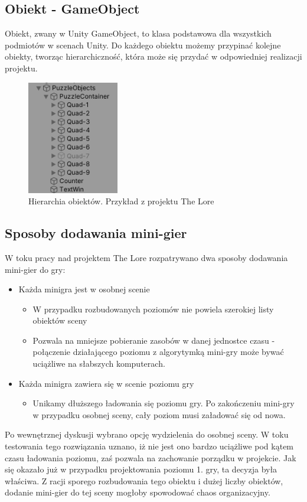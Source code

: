 \documentclass[oneside,polski,logo]{amuthesis}
\begin{document}
\subsection{Obiekt - GameObject}
Obiekt, zwany w Unity GameObject, to klasa podstawowa dla wszystkich podmiotów w scenach Unity. Do każdego obiektu możemy przypinać kolejne obiekty, tworząc hierarchiczność, która może się przydać w odpowiedniej realizacji projektu. \cite{gameobject}
\begin{figure} %
	\centering
	\includegraphics[width=4cm]{images/tyrek/hierarchia.png}
	\caption{Hierarchia obiektów. Przykład z projektu The Lore}
\end{figure}
\subsection{Sposoby dodawania mini-gier}
W toku pracy nad projektem The Lore rozpatrywano dwa sposoby dodawania mini-gier do gry:
\begin{itemize}
	\item{Każda minigra jest w osobnej scenie}
	\begin{itemize}
		\item W przypadku rozbudowanych poziomów nie powiela szerokiej listy obiektów sceny
		\item Pozwala na mniejsze pobieranie zasobów w danej jednostce czasu - połączenie działającego poziomu z algorytymką mini-gry może bywać uciążliwe na słabszych komputerach.
	\end{itemize}
	\item{Każda minigra zawiera się w scenie poziomu gry}
		\begin{itemize}
		\item Unikamy dłuższego ładowania się poziomu gry. Po zakończeniu mini-gry w przypadku osobnej sceny, cały poziom musi załadować się od nowa.
	\end{itemize}
\end{itemize}
Po wewnętrznej dyskusji wybrano opcję wydzielenia do osobnej sceny. W toku testowania tego rozwiązania uznano, iż nie jest ono bardzo uciążliwe pod kątem czasu ładowania poziomu, zaś pozwala na zachowanie porządku w projekcie. Jak się okazało już w przypadku projektowania poziomu 1. gry, ta decyzja była właściwa. Z racji sporego rozbudowania tego obiektu i dużej liczby obiektów, dodanie mini-gier do tej sceny mogłoby spowodować chaos organizacyjny.
\end{document}
